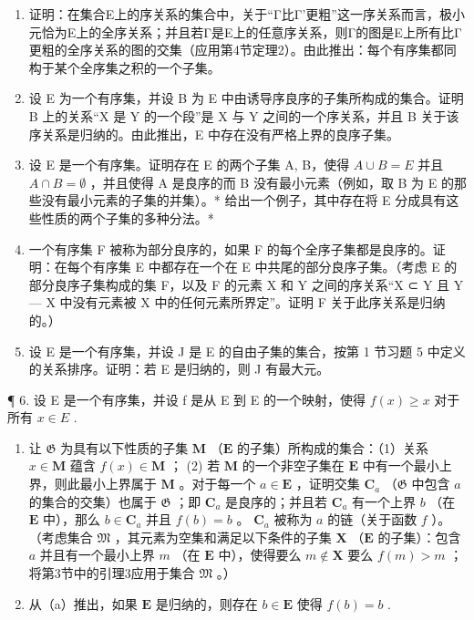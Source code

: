 \exercisegroup

\begin{enumerate}
\def\labelenumi{\arabic{enumi}.}
\item
  证明：在集合E上的序关系的集合中，关于“Γ比Γ'更粗”这一序关系而言，极小元恰为E上的全序关系；并且若Γ是E上的任意序关系，则Γ的图是E上所有比Γ更粗的全序关系的图的交集（应用第4节定理2）。由此推出：每个有序集都同构于某个全序集之积的一个子集。
\item
  设 E 为一个有序集，并设 B 为 E 中由诱导序良序的子集所构成的集合。证明 B 上的关系“X 是 Y 的一个段”是 X 与 Y 之间的一个序关系，并且 B 关于该序关系是归纳的。由此推出，E 中存在没有严格上界的良序子集。
\item
  设 E 是一个有序集。证明存在 E 的两个子集 A, B，使得 \(A \cup B = E\) 并且 \(A \cap B = \emptyset\) ，并且使得 A 是良序的而 B 没有最小元素（例如，取 B 为 E 的那些没有最小元素的子集的并集）。* 给出一个例子，其中存在将 E 分成具有这些性质的两个子集的多种分法。*
\item
  一个有序集 F 被称为部分良序的，如果 F 的每个全序子集都是良序的。证明：在每个有序集 E 中都存在一个在 E 中共尾的部分良序子集。（考虑 E 的部分良序子集构成的集 F，以及 F 的元素 X 和 Y 之间的序关系“X ⊂ Y 且 Y --- X 中没有元素被 X 中的任何元素所界定”。证明 F 关于此序关系是归纳的。）
\item
  设 E 是一个有序集，并设 J 是 E 的自由子集的集合，按第 1 节习题 5 中定义的关系排序。证明：若 E 是归纳的，则 J 有最大元。
\end{enumerate}

¶ 6. 设 E 是一个有序集，并设 f 是从 E 到 E 的一个映射，使得 \(f(x) \geqslant x\) 对于所有 \(x \in E\) .

\begin{enumerate}
\def\labelenumi{(\alph{enumi})}
\item
  让 \(\mathfrak{G}\) 为具有以下性质的子集 \(\mathbf{M}\) （\(\mathbf{E}\) 的子集）所构成的集合：（1）关系 \(x \in \mathbf{M}\) 蕴含 \(f(x) \in \mathbf{M}\) ； (2) 若 \(\mathbf{M}\) 的一个非空子集在 \(\mathbf{E}\) 中有一个最小上界，则此最小上界属于 \(\mathbf{M}\) 。对于每一个 \(a \in \mathbf{E}\) ，证明交集 \(\mathbf{C}_a\) （\(\mathfrak{G}\) 中包含 \(a\) 的集合的交集）也属于 \(\mathfrak{G}\) ；即 \(\mathbf{C}_a\) 是良序的；并且若 \(\mathbf{C}_a\) 有一个上界 \(b\) （在 \(\mathbf{E}\) 中），那么 \(b \in \mathbf{C}_a\) 并且 \(f(b) = b\) 。 \(\mathbf{C}_a\) 被称为 \(a\) 的链（关于函数 \(f\) ）。（考虑集合 \(\mathfrak{M}\) ，其元素为空集和满足以下条件的子集 \(\mathbf{X}\) （\(\mathbf{E}\) 的子集）：包含 \(a\) 并且有一个最小上界 \(m\) （在 \(\mathbf{E}\) 中），使得要么 \(m \notin \mathbf{X}\) 要么 \(f(m) > m\) ；将第3节中的引理3应用于集合 \(\mathfrak{M}\) 。）
\item
  从（a）推出，如果 \(\mathbf{E}\) 是归纳的，则存在 \(b \in \mathbf{E}\) 使得 \(f(b) = b\) .
\end{enumerate}

